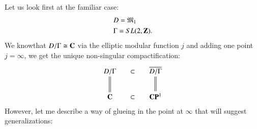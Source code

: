 \section{}\label{art8-sec1}
Let us look first at the familiar case:
\begin{align*}
& D = \mathfrak{M}_1\\
&\Gamma = S L (2, \mathbf{Z}).
\end{align*}
We know\pageoriginale that $D / \Gamma \cong \mathbf{C}$ via the elliptic modular function $j$ and adding one point $j = \infty$, we get the unique non-singular compactification:
$$
\xymatrix@R=0.7cm@C=0.5cm{
D/ \Gamma \ar@{=}[d] & \subset & \overline{D / \Gamma} \ar@{=}[d]\\
\bC & \subset & \bC \bP^1
}
$$
However, let me describe a way of glueing in the point at $\infty$ that will suggest generalizations:

